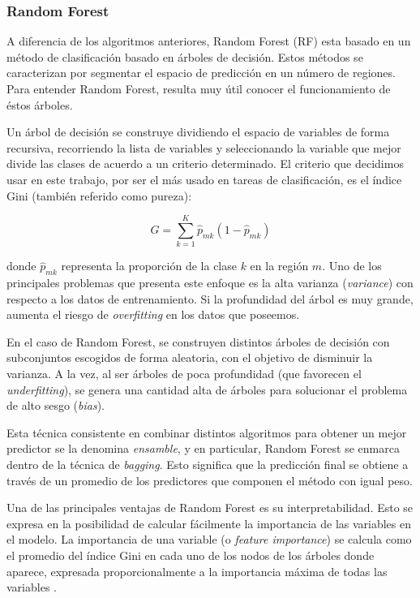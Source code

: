 \subsubsection{Random Forest}

A diferencia de los algoritmos anteriores, Random Forest (RF) esta basado en un método de clasificación basado en árboles de decisión. Estos métodos se caracterizan por segmentar el espacio de predicción en un número de regiones. Para entender Random Forest, resulta muy útil conocer el funcionamiento de éstos árboles. 

Un árbol de decisión se construye dividiendo el espacio de variables de forma recursiva, recorriendo la lista de variables y seleccionando la variable que mejor divide las clases de acuerdo a un criterio determinado. El criterio que decidimos usar en este trabajo, por ser el más usado en tareas de clasificación, es el índice Gini (también referido como pureza):

\begin{equation*}
    G = \sum_{k = 1}^{K} \hat{p}_{mk}(1 - \hat{p}_{mk})
\end{equation*}

donde $\hat{p}_{mk}$ representa la proporción de la clase $k$ en la región $m$. Uno de los principales problemas que presenta este enfoque es la alta varianza (\textit{variance}) con respecto a los datos de entrenamiento. Si la profundidad del árbol es muy grande, aumenta el riesgo de \textit{overfitting} en los datos que poseemos. 

En el caso de Random Forest, se construyen distintos árboles de decisión con subconjuntos escogidos de forma aleatoria, con el objetivo de disminuir la varianza. A la vez, al ser árboles de poca profundidad (que favorecen el \textit{underfitting}), se genera una cantidad alta de árboles para solucionar el problema de alto sesgo (\textit{bias}). 

Esta técnica consistente en combinar distintos algoritmos para obtener un mejor predictor se la denomina \textit{ensamble}, y en particular, Random Forest se enmarca dentro de la técnica de \textit{bagging}. Esto significa que la predicción final se obtiene a través de un promedio de los predictores que componen el método con igual peso.

Una de las principales ventajas de Random Forest es su interpretabilidad. Esto se expresa en la posibilidad de calcular fácilmente la importancia de las variables en el modelo. La importancia de una variable (o \textit{feature importance}) se calcula como el promedio del índice Gini en cada uno de los nodos de los árboles donde aparece, expresada proporcionalmente a la importancia máxima de todas las variables \cite{Hastie2001}.

